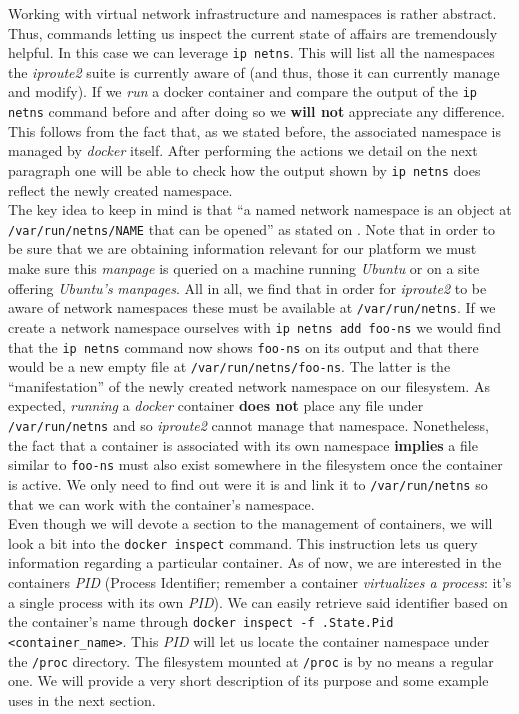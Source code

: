                 Working with virtual network infrastructure and namespaces is rather abstract. Thus, commands letting us inspect the current state of affairs are tremendously helpful. In this case we can leverage \texttt{ip netns}. This will list all the namespaces the \textit{iproute2} suite is currently aware of (and thus, those it can currently manage and modify). If we \textit{run} a docker container and compare the output of the \texttt{ip netns} command before and after doing so we \textbf{will not} appreciate any difference. This follows from the fact that, as we stated before, the associated namespace is managed by \textit{docker} itself. After performing the actions we detail on the next paragraph one will be able to check how the output shown by \texttt{ip netns} does reflect the newly created namespace.\\

                The key idea to keep in mind is that ``a named network namespace is an object at \texttt{/var/run/netns/NAME} that can be opened'' as stated on \cite{bib:man-ip-netns}. Note that in order to be sure that we are obtaining information relevant for our platform we must make sure this \textit{manpage} is queried on a machine running \textit{Ubuntu} or on a site offering \textit{Ubuntu's} \textit{manpages}. All in all, we find that in order for \textit{iproute2} to be aware of network namespaces these must be available at \texttt{/var/run/netns}. If we create a network namespace ourselves with \texttt{ip netns add foo-ns} we would find that the \texttt{ip netns} command now shows \texttt{foo-ns} on its output and that there would be a new empty file at \texttt{/var/run/netns/foo-ns}. The latter is the ``manifestation'' of the newly created network namespace on our filesystem. As expected, \textit{running} a \textit{docker} container \textbf{does not} place any file under \texttt{/var/run/netns} and so \textit{iproute2} cannot manage that namespace. Nonetheless, the fact that a container is associated with its own namespace \textbf{implies} a file similar to \texttt{foo-ns} must also exist somewhere in the filesystem once the container is active. We only need to find out were it is and link it to \texttt{/var/run/netns} so that we can work with the container's namespace.\\

                Even though we will devote a section to the management of containers, we will look a bit into the \texttt{docker inspect} command. This instruction lets us query information regarding a particular container. As of now, we are interested in the containers \textit{PID} (Process Identifier; remember a container \textit{virtualizes a process}: it's a single process with its own \textit{PID}). We can easily retrieve said identifier based on the container's name through \texttt{docker inspect -f {{.State.Pid}} <container\_name>}. This \textit{PID} will let us locate the container namespace under the \texttt{/proc} directory. The filesystem mounted at \texttt{/proc} is by no means a regular one. We will provide a very short description of its purpose and some example uses in the next section.\\

